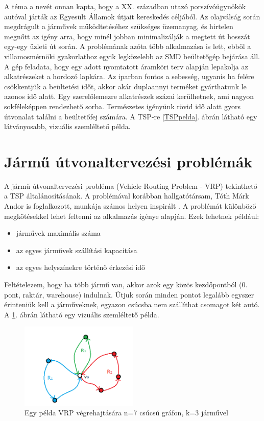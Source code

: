 A téma a nevét onnan kapta, hogy a XX. században utazó porszívóügynökök autóval járták az Egyesült Államok útjait kereskedés céljából. Az olajválság során megdrágult a járművek működtetéséhez szükséges üzemanyag, és hirtelen megnőtt az igény arra, hogy minél jobban minimalizálják a megtett út hosszát egy-egy üzleti út során. A problémának azóta több alkalmazása is lett, ebből a villamosmérnöki gyakorlathoz egyik legközelebb az SMD beültetőgép bejárása áll. A gép feladata, hogy egy adott nyomtatott áramköri terv alapján lepakolja az alkatrészeket a hordozó lapkára. Az iparban fontos a sebesség, ugyanis ha felére csökkentjük a beültetési időt, akkor akár duplaannyi terméket gyárthatunk le azonos idő alatt. Egy szerelőlemezre alkatrészek százai kerülhetnek, ami nagyon sokféleképpen rendezhető sorba. Természetes igényünk  rövid idő alatt gyors útvonalat találni a beültetőfej számára. A TSP-re \ref{TSPpelda}. ábrán látható egy látványosabb, vizuális szemléltető példa.

\section{Jármű útvonaltervezési problémák \label{VRPsection}}
A jármű útvonaltervezési probléma (Vehicle Routing Problem - VRP) tekinthető a TSP általánosításának. A problémával korábban hallgatótársam, Tóth Márk Andor is foglalkozott, munkája számos helyen inspirált \cite{alg_optim}. A problémát különböző megkötésekkel lehet feltenni az alkalmazás igénye alapján. Ezek lehetnek például:
\begin{itemize}
	\item járművek maximális száma
	\item az egyes járművek szállítási kapacitása
	\item az egyes helyszínekre történő érkezési idő
\end{itemize}

Feltételezem, hogy ha több jármű van, akkor azok egy közös kezdőpontból (0. pont, raktár, warehouse) indulnak. Útjuk során minden pontot legalább egyszer érinteniük kell a járműveknek, egyazon csúcsba nem szállíthat csomagot két autó. A \ref{VRPpelda}. ábrán látható egy vizuális szemléltető példa.

\begin{figure}[ht!]
	\centering
	\includegraphics[width=0.5\textwidth]{figures/VRP_Szoveg_nelkul.png}
	\caption{Egy példa VRP végrehajtására n=7 csúcsú gráfon, k=3 járművel \label{VRPpelda} }
\end{figure}

